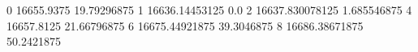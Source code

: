 0 16655.9375 19.79296875
1 16636.14453125 0.0
2 16637.830078125 1.685546875
4 16657.8125 21.66796875
6 16675.44921875 39.3046875
8 16686.38671875 50.2421875
